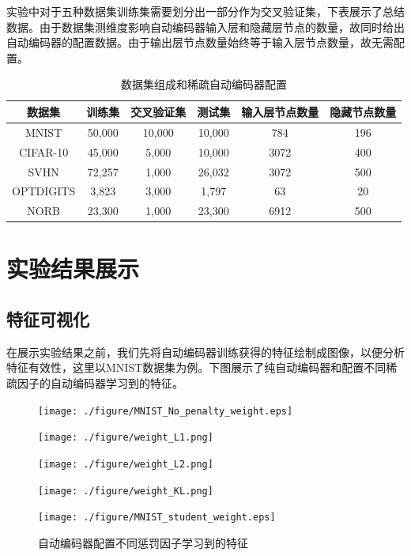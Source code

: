\documentclass[oneside]{ZJUthesis}
\begin{document}
实验中对于五种数据集训练集需要划分出一部分作为交叉验证集，下表展示了总结数据。由于数据集测维度影响自动编码器输入层和隐藏层节点的数量，故同时给出自动编码器的配置数据。由于输出层节点数量始终等于输入层节点数量，故无需配置。
\begin{table}[h]
\begin{center}
{
\caption{数据集组成和稀疏自动编码器配置}\label{datasetconfig}}
\begin{tabular}{|c|c|c|c|c|c|}
\hline
数据集& 训练集&交叉验证集&测试集&输入层节点数量&隐藏节点数量\\
\hline
MNIST & 50,000 & 10,000 & 10,000 & 784 & 196 \\
\hline
CIFAR-10 & 45,000 & 5,000 & 10,000 & 3072 & 400 \\
\hline
SVHN  & 72,257 & 1,000 & 26,032 & 3072 & 500 \\
\hline
OPTDIGITS & 3,823 & 3,000 & 1,797 & 63 & 20 \\
\hline
NORB  & 23,300 & 1,000 & 23,300 & 6912 & 500 \\
\hline
\end{tabular}
\end{center}
\end{table}



\section{实验结果展示}
\subsection{特征可视化}
在展示实验结果之前，我们先将自动编码器训练获得的特征绘制成图像，以便分析特征有效性，这里以MNIST数据集为例。下图展示了纯自动编码器和配置不同稀疏因子的自动编码器学习到的特征。

\begin{figure}[h]  
\centering
\caption{自动编码器配置不同惩罚因子学习到的特征\label{fig:no}}  
\begin{minipage}[h]{0.8\linewidth}
\centering
\texttt{[image: ./figure/MNIST\_No\_penalty\_weight.eps]}
\end{minipage}
\hfill
\begin{minipage}[h]{0.8\linewidth}
\centering
\texttt{[image: ./figure/weight\_L1.png]}
\end{minipage}
\hfill
\begin{minipage}[h]{0.8\linewidth}
\centering
\texttt{[image: ./figure/weight\_L2.png]}
\end{minipage}
\hfill
\begin{minipage}[h]{0.8\linewidth}
\centering
\texttt{[image: ./figure/weight\_KL.png]}
\end{minipage}
\hfill
\begin{minipage}[h]{0.8\linewidth}
\centering
\texttt{[image: ./figure/MNIST\_student\_weight.eps]}
\end{minipage}
\end{figure}
\end{document}
